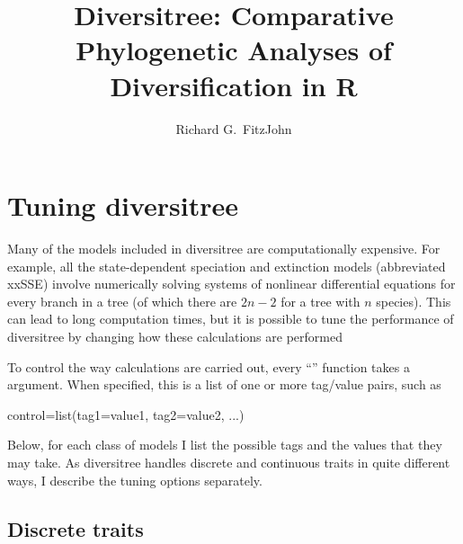 \documentclass[12pt,twoside]{article}
\title{Diversitree: Comparative
  Phylogenetic Analyses of Diversification in R}
\author{Richard G.\ FitzJohn}
\date{}
\begin{document}
\maketitle


\section{Tuning diversitree}
\label{sec:tuning}

Many of the models included in diversitree are computationally
expensive.  For example, all the state-dependent speciation and
extinction models (abbreviated xxSSE) involve numerically solving
systems of nonlinear differential equations for every branch in a tree
(of which there are $2n-2$ for a tree with $n$ species).  This can
lead to long computation times, but it is possible to tune the
performance of diversitree by changing how these calculations are
performed

To control the way calculations are carried out, every ``''
function takes a  argument.  When specified, this is a
list of one or more tag/value pairs, such as
\begin{Schunk}
\begin{Sinput}
  control=list(tag1=value1, tag2=value2, ...)
\end{Sinput}
\end{Schunk}
Below, for each class of models I list the possible tags and the
values that they may take.  As diversitree handles discrete and
continuous traits in quite different ways, I describe the tuning
options separately.


\subsection{Discrete traits}
\end{document}
